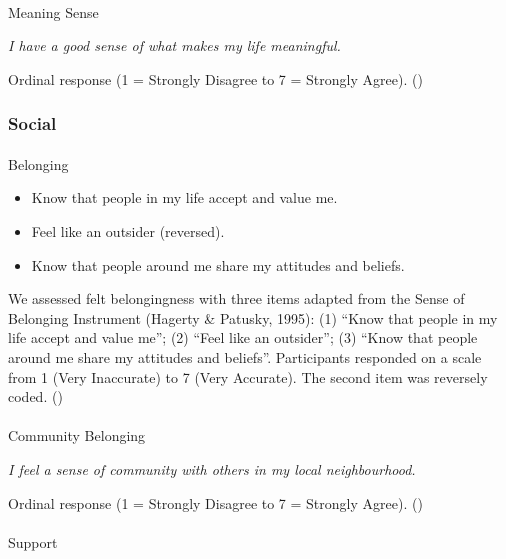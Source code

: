 \documentclass[
  single column]{article}
\makeatletter
\let\oldparagraph\paragraph
\renewcommand{\paragraph}{
    \@ifstar
      \xxxParagraphStar
      \xxxParagraphNoStar
  }
\newcommand{\xxxParagraphStar}[1]{\oldparagraph*{#1}\mbox{}}
\newcommand{\xxxParagraphNoStar}[1]{\oldparagraph{#1}\mbox{}}
\providecommand{\tightlist}{%
  \setlength{\itemsep}{0pt}\setlength{\parskip}{0pt}}\usepackage{longtable,booktabs,array}
\makeatother
\begin{document}
\paragraph{Meaning Sense}\label{meaning-sense-1}

\emph{I have a good sense of what makes my life meaningful.}

Ordinal response (1 = Strongly Disagree to 7 = Strongly Agree).
()

\subsubsection{Social}\label{social}

\paragraph{Belonging}\label{belonging-1}

\begin{itemize}
\tightlist
\item
  Know that people in my life accept and value me.
\item
  Feel like an outsider (reversed).
\item
  Know that people around me share my attitudes and beliefs.
\end{itemize}

We assessed felt belongingness with three items adapted from the Sense
of Belonging Instrument (Hagerty \& Patusky, 1995): (1) ``Know that
people in my life accept and value me''; (2) ``Feel like an outsider'';
(3) ``Know that people around me share my attitudes and beliefs''.
Participants responded on a scale from 1 (Very Inaccurate) to 7 (Very
Accurate). The second item was reversely coded.
()

\paragraph{Community Belonging}\label{community-belonging}

\emph{I feel a sense of community with others in my local
neighbourhood.}

Ordinal response (1 = Strongly Disagree to 7 = Strongly Agree).
()

\paragraph{Support}\label{support}
\end{document}
